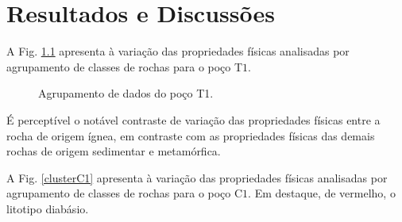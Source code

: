 \chapter{Resultados e Discussões}

A Fig. \ref{clusterT1} apresenta à variação das propriedades físicas analisadas por agrupamento de classes de rochas para o poço T$1$. 

\begin{figure}[H]
	\centering
	\setlength{\fboxsep}{8pt}
	\setlength{\fboxrule}{0.1pt}
	\caption{Agrupamento de dados do poço T1.}
	\label{clusterT1}
\end{figure} 

É perceptível o notável contraste de variação das propriedades físicas entre a rocha de origem ígnea, em contraste com as propriedades físicas das demais rochas de origem sedimentar e metamórfica. 

A Fig. \ref{clusterC1} apresenta à variação das propriedades físicas analisadas por agrupamento de classes de rochas para o poço C$1$. Em destaque, de vermelho, o litotipo diabásio. 

